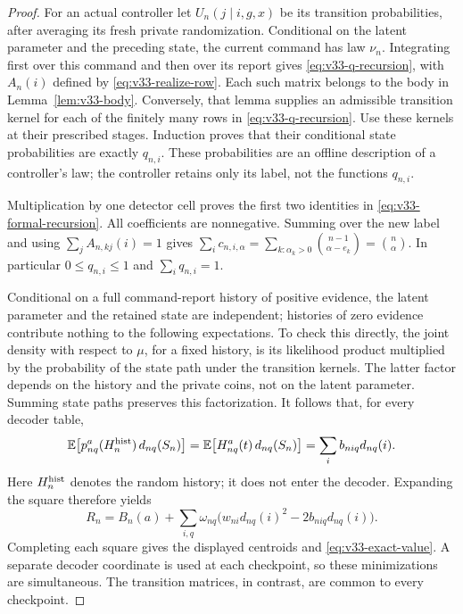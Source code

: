 \begin{proof}
For an actual controller let $U_n(j\mid i,g,x)$ be its transition
probabilities, after averaging its fresh private randomization.
Conditional on the latent parameter and the preceding state, the
current command has law $\nu_n$. Integrating first over this command
and then over its report gives \eqref{eq:v33-q-recursion}, with
$A_n(i)$ defined by \eqref{eq:v33-realize-row}. Each such matrix
belongs to the body in Lemma~\ref{lem:v33-body}.
Conversely, that lemma supplies an admissible transition kernel for
each of the finitely many rows in \eqref{eq:v33-q-recursion}. Use
these kernels at their prescribed stages. Induction proves that their
conditional state probabilities are exactly $q_{n,i}$. These
probabilities are an offline description of a controller's law; the
controller retains only its label, not the functions $q_{n,i}$.

Multiplication by one detector cell proves the first two identities
in \eqref{eq:v33-formal-recursion}. All coefficients are nonnegative.
Summing over the new label and using $\sum_j A_{n,kj}(i)=1$ gives
$\sum_i c_{n,i,\alpha}=\sum_{k:\alpha_k>0}\binom{n-1}{\alpha-e_k}
=\binom n\alpha$. In particular $0\le q_{n,i}\le1$ and
$\sum_i q_{n,i}=1$.

Conditional on a full command-report history of positive evidence,
the latent parameter and the retained state are independent; histories
of zero evidence contribute nothing to the following expectations. To check this directly, the
joint density with respect to $\mu$, for a fixed history, is its
likelihood product multiplied by the probability of the state path
under the transition kernels. The latter factor depends on the
history and the private coins, not on the latent parameter. Summing
state paths preserves this factorization. It follows that, for every
decoder table,
\[
 \mathbb E\bigl[p^a_{nq}(H_n^{\rm hist})\,d_{nq}(S_n)\bigr]
       =\mathbb E\bigl[H^a_{nq}(t)\,d_{nq}(S_n)\bigr]
       =\sum_i b_{niq}d_{nq}(i).
\]
Here $H_n^{\rm hist}$ denotes the random history;
it does not enter the decoder. Expanding the square therefore yields
\begin{equation}\label{eq:v33-fixed-decoder}
 R_n=B_n(a)+\sum_{i,q}\omega_{nq}
          \bigl(w_{ni}d_{nq}(i)^2-2b_{niq}d_{nq}(i)\bigr).
\end{equation}
Completing each square gives the displayed centroids and
\eqref{eq:v33-exact-value}. A separate decoder coordinate is used
at each checkpoint, so these minimizations are simultaneous. The
transition matrices, in contrast, are common to every checkpoint.


\end{proof}
